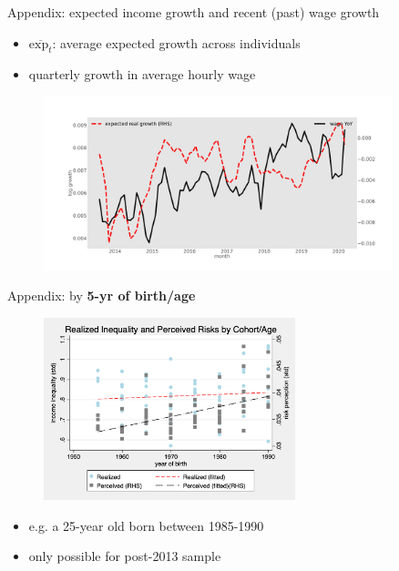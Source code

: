 \documentclass{beamer}
\begin{document}
\begin{frame}{Appendix: expected income growth and recent (past) wage growth}
	\label{appendix:tsMean3mvrexp_he}
	\begin{itemize}
		\item $\overline{\text{exp}_{t}} $: average expected growth across individuals
		\item  quarterly growth in average hourly wage
	\end{itemize}
	\begin{figure}
		\centering
		\label{ts_exp}
		\includegraphics[width=0.9\textwidth]{figures/tsMean3mvrexp_he.jpg}
	\end{figure}
	\quad  \hyperlink{tsMean3mvrvar_he}{} 
\end{frame}


\begin{frame}{Appendix: by \textbf{5-yr of birth/age}}
	\label{appendix:cohort_age_compare}
	\begin{figure}[ht]
		\centering
		\includegraphics[width=0.65\textwidth]{figures/real_log_wage_shk_by_byear_age_compare.png}
	\end{figure}
	\begin{itemize}
		\item e.g. a 25-year old born between 1985-1990
		\item only possible for post-2013 sample 
		\quad \hyperlink{cohort_age_compare}{}     
	\end{itemize}
\end{frame}
\end{document}
